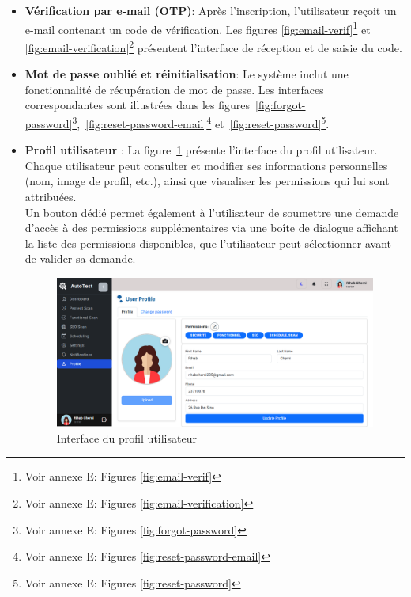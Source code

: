\begin{itemize}[label=$\bullet$]
    \item \textbf{Vérification par e-mail (OTP)}:
        Après l’inscription, l’utilisateur reçoit un e-mail contenant un code de vérification. Les figures \ref{fig:email-verif}\footnote{Voir annexe E: Figures \ref{fig:email-verif}} et \ref{fig:email-verification}\footnote{Voir annexe E: Figures \ref{fig:email-verification}} présentent l’interface de réception et de saisie du code.
    \item \textbf{Mot de passe oublié et réinitialisation}:
        Le système inclut une fonctionnalité de récupération de mot de passe. Les interfaces correspondantes sont illustrées dans les figures~\ref{fig:forgot-password}\footnote{Voir annexe E: Figures \ref{fig:forgot-password}},~\ref{fig:reset-password-email}\footnote{Voir annexe E: Figures \ref{fig:reset-password-email}} et~\ref{fig:reset-password}\footnote{Voir annexe E: Figures \ref{fig:reset-password}}.
        \item \textbf{Profil utilisateur} : La figure~\ref{fig:profile} présente l’interface du profil utilisateur. Chaque utilisateur peut consulter et modifier ses informations personnelles (nom, image de profil, etc.), ainsi que visualiser les permissions qui lui sont attribuées. \\ Un bouton dédié permet également à l’utilisateur de soumettre une demande d’accès à des permissions supplémentaires via une boîte de dialogue affichant la liste des permissions disponibles, que l’utilisateur peut sélectionner avant de valider sa demande.
         \begin{figure}[H]
                \centering
                \includegraphics[width=\linewidth]{chapitres/ch3Sp1/section/sprint1/img/interface/profile.png}
                \caption{\centering Interface du profil utilisateur}
                \label{fig:profile}
            \end{figure}
        \vspace{-0.3cm}

\end{itemize}
